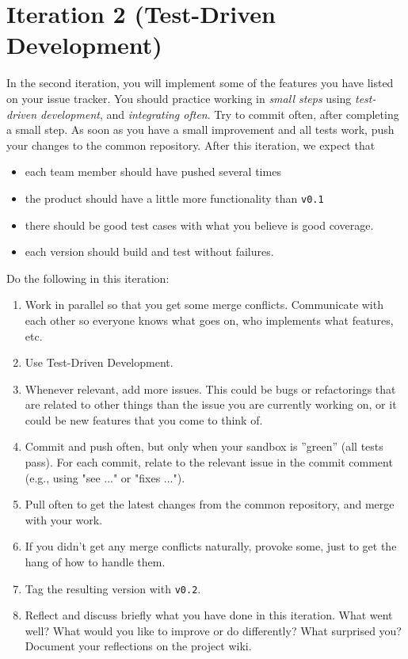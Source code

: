 \documentclass[swedish,english]{article}
\begin{document}
\section*{Iteration 2 (Test-Driven Development)}
In the second iteration, you will implement some of the features you have listed on your issue tracker. You should practice working in \emph{small steps} using \emph{test-driven development}, and \emph{integrating often}. Try to commit often, after completing a small step. As soon as you have a small improvement and all tests work, push your changes to the common repository. After this iteration, we expect that
\begin{itemize}
\item each team member should have pushed several times
\item the product should have a little more functionality than \verb'v0.1'
\item there should be good test cases with what you believe is good coverage.
\item each version should build and test without failures.
\end{itemize}

Do the following in this iteration:

\begin{enumerate}
\item Work in parallel so that you get some merge conflicts. Communicate with each other so everyone knows what goes on, who implements what features, etc.
\item Use Test-Driven Development. %
\item Whenever relevant, add more issues. This could be bugs or refactorings that are related to other things than the issue you are currently working on, or it could be new features that you come to think of. 
\item Commit and push often, but only when your sandbox is ''green'' (all tests pass). For each commit, relate to the relevant issue in the commit comment (e.g., using "see ..." or "fixes ...").
\item Pull often to get the latest changes from the common repository, and merge with your work.
\item If you didn't get any merge conflicts naturally, provoke some, just to get the hang of how to handle them.
\item Tag the resulting version with \verb'v0.2'.
\item Reflect and discuss briefly what you have done in this iteration. What went well? What would you like to improve or do differently? What surprised you? Document your reflections on the project wiki.
\end{enumerate}
\end{document}
